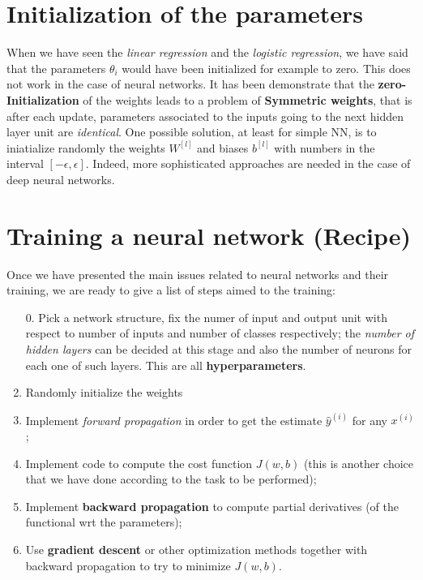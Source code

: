 \section{Initialization of the parameters}
When we have seen the \textit{linear regression} and the \textit{logistic regression}, we have said that the parameters $\theta_i$ would have been initialized for example to zero. This does not work in the case of neural networks. It has been demonstrate that the \textbf{zero-Initialization} of the weights leads to a problem of \textbf{Symmetric weights}, that is after each update, parameters associated to the inputs going to the next hidden layer unit are \textit{identical}. One possible solution, at least for simple NN, is to iniatialize randomly the weights $W^{[l]}$ and biases $b^{[l]}$ with numbers in the interval $[-\epsilon, \epsilon]$. Indeed, more sophisticated approaches are needed in the case of deep neural networks.

\section{Training a neural network (Recipe)}
Once we have presented the main issues related to neural networks and their training, we are ready to give a list of steps aimed to the training: 
\begin{enumerate}
    \itemsep-0.3em
    \item[0.] Pick a network structure, fix the numer of input and output unit with respect to number of inputs and number of classes respectively; the \textit{number of hidden layers} can be decided at this stage and also the number of neurons for each one of such layers. This are all \textbf{hyperparameters}.
    \item Randomly initialize the weights
    \item Implement \textit{forward propagation} in order to get the estimate $\hat{y}^{(i)}$ for any $x^{(i)}$;
    \item Implement code to compute the cost function $J(w,b)$ (this is another choice that we have done according to the task to be performed); 
    \item Implement \textbf{backward propagation} to compute partial derivatives (of the functional wrt the parameters);
    \item Use \textbf{gradient descent} or other optimization methods together with backward propagation to try to minimize $J(w,b)$.
\end{enumerate}

